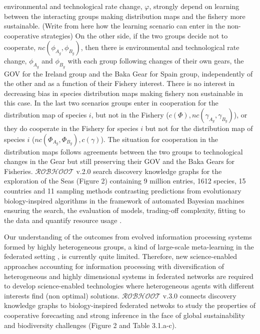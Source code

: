 \documentclass[11pt, a4paper]{article} %
\begin{document}
{environmental and technological rate change, $\varphi$, strongly
depend on learning between the interacting groups making distribution
maps and the fishery more sustainable.
(Write from here how the learning scenario can enter in the
non-cooperative strategies) On the other side, if the two groups
decide not to cooperate, $nc(\phi_{A_{g}},\phi_{B_{g}})$, then there
is environmental and technological rate change, $\phi_{A_{g}}$ and
$\phi_{B_{g}}$ with each group following changes of their own gears,
the GOV for the Ireland group and the Baka Gear for Spain group,
independently of the other and as a function of their Fishery
interest. There is no interest in decreasing bias in species
distribution maps making fishery non sustainable in this case. In the
last two scenarios groups enter in cooperation for the distribution
map of species $i$, but not in the Fishery
($c(\Phi), nc(\gamma_{A_{g}},\gamma_{B_{g}})$), or they do cooperate
in the Fishery for species $i$ but not for the distribution map of
species $i$ ($nc(\Phi_{A_{g}},\Phi_{B_{g}}), c(\gamma)$). The
situation for cooperation in the distribution maps follows agreements
between the two groups to technological changes in the Gear but still
preserving their GOV and the Baka Gears for
Fisheries. $\mathcal{ROBHOOT}$ v.2.0 search discovery knowledge graphs
for the exploration of the Seas (Figure 2) containing 9 million
entries, 1612 species, 15 countries and 11 sampling methods
contrasting predictions from evolutionary biology-inspired algorithms
in the framework of automated Bayesian machines ensuring the search,
the evaluation of models, trading-off complexity, fitting to the data
and quantify resource usage \citep{Guimera2020,Steinruecken}. }
 
Our understanding of the outcomes from evolved information processing
systems formed by highly heterogeneous groups, a kind of large-scale
meta-learning in the federated setting \citep{Dilley2016}, is
currently quite limited. Therefore, new science-enabled approaches
accounting for information processing with diversification of
heterogeneous and highly dimensional systems in federated networks are
required to develop science-enabled technologies where heterogeneous
agents with different interests find (non optimal)
solutions. $\mathcal{ROBHOOT}$ v.3.0 connects discovery knowledge
graphs to biology-inspired federated netwoks to study the properties
of cooperative forecasting and strong inference in the face of global
sustainability and biodiversity challenges (Figure 2 and Table
3.1.a-c).
\end{document}
